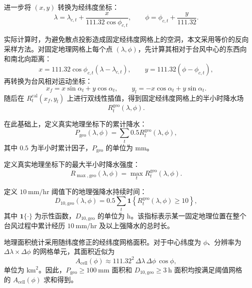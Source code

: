 \documentclass[UTF8,a4paper,zihao=5,fontset=fandol]{ctexart}
\numberwithin{equation}{section}
\numberwithin{figure}{section}
\numberwithin{table}{section}
\begin{document}
进一步将 $(x,y)$ 转换为经纬度坐标：
\begin{equation}
\lambda=\lambda_{c,t}
+\frac{x}{111.32\cos\phi_{c,t}},
\qquad
\phi=\phi_{c,t}
+\frac{y}{111.32}.
\end{equation}

实际计算时，为避免散点投影造成固定经纬度网格上的空洞，本文采用等价的反向采样方法。对固定地理网格上每个点 $(\lambda,\phi)$，先计算其相对于台风中心的东西向和南北向距离：
\begin{equation}
x=111.32\cos\phi_{c,t}(\lambda-\lambda_{c,t}),
\qquad
y=111.32(\phi-\phi_{c,t}),
\end{equation}
再转换为台风相对运动坐标：
\begin{equation}
x_f=x\sin\alpha_t+y\cos\alpha_t,
\qquad
y_l=-x\cos\alpha_t+y\sin\alpha_t.
\end{equation}
随后在 $R_t^{\mathrm{cal}}(x_f,y_l)$ 上进行双线性插值，得到固定经纬度网格上的半小时降水场
\begin{equation}
R_t^{\mathrm{geo}}(\lambda,\phi).
\end{equation}

在此基础上，定义真实地理坐标下的累计降水：
\begin{equation}
P_{\mathrm{geo}}(\lambda,\phi)
=
\sum_t 0.5 R_t^{\mathrm{geo}}(\lambda,\phi),
\end{equation}
其中 $0.5$ 为半小时累计因子，$P_{\mathrm{geo}}$ 的单位为 mm。

定义真实地理坐标下的最大半小时降水强度：
\begin{equation}
R_{\max,\mathrm{geo}}(\lambda,\phi)
=
\max_t R_t^{\mathrm{geo}}(\lambda,\phi).
\end{equation}

定义 $10\ \mathrm{mm/hr}$ 阈值下的地理强降水持续时间：
\begin{equation}
D_{10,\mathrm{geo}}(\lambda,\phi)
=
0.5\sum_t
\mathbf{1}
\left\{
R_t^{\mathrm{geo}}(\lambda,\phi)\ge 10
\right\},
\end{equation}
其中 $\mathbf{1}\{\cdot\}$ 为示性函数，$D_{10,\mathrm{geo}}$ 的单位为 h。该指标表示某一固定地理位置在整个台风过程中累计经历 $10\ \mathrm{mm/hr}$ 及以上强降水的总时长。

地理面积统计采用随纬度修正的经纬度网格面积。对于中心纬度为 $\phi$、分辨率为 $\Delta\lambda\times\Delta\phi$ 的网格单元，其面积近似为
\begin{equation}
A_{\mathrm{cell}}(\phi)
\approx
111.32^2\,\Delta\lambda\,\Delta\phi\,\cos\phi,
\end{equation}
单位为 km$^2$。因此，$P_{\mathrm{geo}}\ge100\ \mathrm{mm}$ 面积和 $D_{10,\mathrm{geo}}\ge3\ \mathrm{h}$ 面积均按满足阈值网格的 $A_{\mathrm{cell}}(\phi)$ 求和得到。
\end{document}
